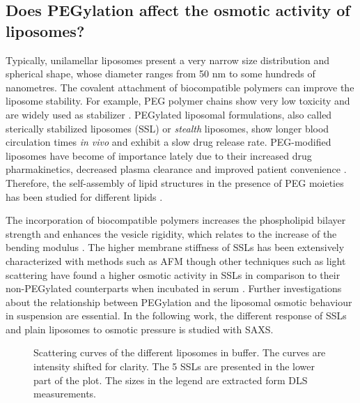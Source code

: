 \subsection{Does PEGylation affect the osmotic activity of liposomes?}
\label{sec:liposome_osmotic}

Typically, unilamellar liposomes present a very narrow size distribution and spherical shape, whose diameter ranges from 50 nm to some hundreds of nanometres. The covalent attachment of biocompatible polymers can improve the liposome stability. For example, PEG polymer chains show very low toxicity \citep{yamaoka_distribution_1994} and are widely used as stabilizer \citep{sou_polyethylene_2000}. PEGylated liposomal formulations, also called sterically stabilized liposomes (SSL) or \emph{stealth} liposomes, show longer blood circulation times \emph{in vivo} \citep{barenholz_liposome_2001} and exhibit a slow drug release rate. PEG-modified liposomes have become of importance lately due to their increased drug pharmakinetics, decreased plasma clearance and improved patient convenience \citep{gabizon_polyethylene_1997,harris_effect_2003}. Therefore, the self-assembly of lipid structures in the presence of PEG moieties has been studied for different lipids \citep{lee_coarse-grained_2011}.

The incorporation of biocompatible polymers increases the phospholipid bilayer strength and enhances the vesicle rigidity, which relates to the increase of the bending modulus \citep{liang_effect_2005, sou_polyethylene_2000}. The higher membrane stiffness of SSLs has been extensively characterized with methods such as AFM \citep{spyratou_atomic_2009} though other techniques such as light scattering have found a higher osmotic activity in SSLs in comparison to their non-PEGylated counterparts when incubated in serum \citep{wolfram_shrinkage_2014}. Further investigations about the relationship between PEGylation and the liposomal osmotic behaviour in suspension are essential. In the following work, the different response of SSLs and plain liposomes to osmotic pressure is studied with SAXS. 

\begin{figure}
	\centering
		
		\caption[Scattering curves of the liposomes in buffer.]{Scattering curves of the different liposomes in buffer. The curves are intensity shifted for clarity. The 5 SSLs are presented in the lower part of the plot. The sizes in the legend are extracted form DLS measurements.}
		\label{fig:SSLSingleContrast}
\end{figure}

